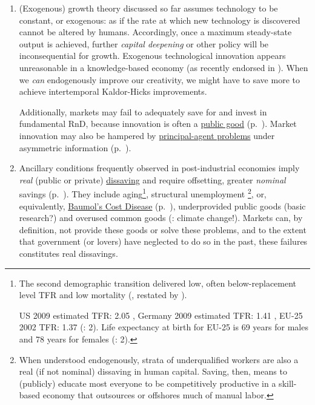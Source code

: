 \begin{enumerate}%
	\item (Exogenous) growth theory discussed so far assumes technology to be constant, or exogenous: as if the rate at which new technology is discovered cannot be altered by humans. Accordingly, once a maximum steady-state output is achieved, further \emph{capital deepening} or other policy will be inconsequential for growth. Exogenous technological innovation appears unreasonable in a knowledge-based economy (as recently endorsed in \citealt{Communities2009}). When we \emph{can} endogenously improve our creativity, we might have to save more to achieve intertemporal Kaldor-Hicks improvements. 

	Additionally, markets may fail to adequately save for and invest in fundamental \gls{RnD}, because innovation is often a \hyperref[sec:public-good]{public good} (p.~\pageref{sec:public-good}). Market innovation may also be hampered by \hyperref[sec:principal-agent-problem]{principal-agent problems} under asymmetric information (p.~\pageref{sec:principal-agent-problem}). 

	\item Ancillary conditions frequently observed in post-industrial economies imply \emph{real} (public or private) \hyperref[sec:delta-net-worth]{dissaving} and require offsetting, greater \emph{nominal} savings (p.~\pageref{sec:delta-net-worth}). They include aging\footnote{
		The second demographic transition delivered low, often below-replacement level \gls{TFR} and low mortality (\citealt{Davis1945}, restated by \citealt{Caldwell-1976-aa}).
		
		US 2009 estimated \gls{TFR}: 2.05 \citep{CIA2009}, Germany 2009 estimated \gls{TFR}: 1.41 \citep{CIA2009}, EU-25 2002 \gls{TFR}: 1.37 (\citealt{Demeny-2003-aa}: 2). Life expectancy at birth for EU-25 is 69 years for males and 78 years for females (\citealt{Demeny-2003-aa}: 2).}, 
	structural unemployment \footnote{
		When understood endogenously, strata of underqualified workers are also a real (if not nominal) dissaving in human capital. Saving, then, means to (publicly) educate most everyone to be competitively productive in a skill-based economy that outsources or offshores much of manual labor.}, 
	or, equivalently, \hyperref[itm:non-linear-returns]{Baumol's Cost Disease} (p.~\pageref{itm:non-linear-returns}), underprovided public goods (basic research?) and overused common goods (\citealt{Stern-2006-aa}: climate change!). Markets can, by definition, not provide these goods or solve these problems, and to the extent that government (or lovers) have neglected to do so in the past, these failures constitutes real dissavings.


\end{enumerate}
